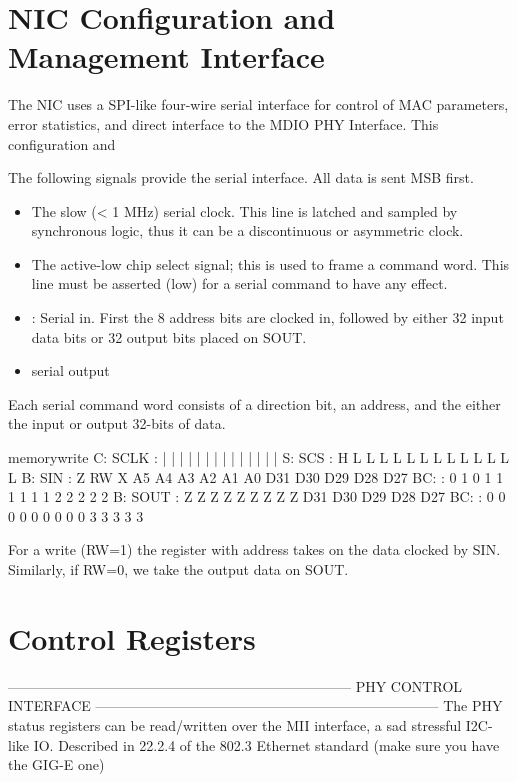 \section{NIC Configuration and Management Interface}
The NIC uses a SPI-like four-wire serial interface for control of MAC parameters, error statistics, and direct interface to the MDIO PHY Interface. This configuration and 


The following signals provide the serial interface. All data is sent MSB first. 
\begin{itemize}
\item {} The slow (< 1 MHz) serial clock. This line is latched and sampled by synchronous logic, thus it can be a discontinuous or asymmetric clock.
\item {} The active-low chip select signal; this is used to frame a command word. This line must be asserted (low) for a serial command to have any effect. 
\item {} : Serial in. First the 8 address bits are clocked in, followed by either 32 input data bits or 32 output bits placed on SOUT.
\item {} serial output
\end{itemize}

Each serial command word consists of a direction bit, an address, and the either the input or output 32-bits of data. 


\begin{timing}{memorywrite}
C: SCLK    :  |  |  |  |  |  |  |  |  |  |   |   |   |   |  
S: SCS     :  H  L  L  L  L  L  L  L  L  L   L   L   L   L  
B: SIN     :  Z  RW X  A5 A4 A3 A2 A1 A0 D31 D30 D29 D28 D27 
BC:        :  0  1  0  1  1  1  1  1  1  2   2   2   2   2
B: SOUT    :  Z  Z  Z  Z  Z  Z  Z  Z  Z  D31 D30 D29 D28 D27
BC:        :  0  0  0  0  0  0  0  0  0  3   3   3   3   3 
\end{timing}

For a write (RW=1) the register with address  takes on the data clocked by SIN. Similarly, if RW=0, we take the output data on SOUT. 

\section{Control Registers}

--------------------------------------------------------------------------
PHY CONTROL INTERFACE
--------------------------------------------------------------------------
The PHY status registers can be read/written over the MII interface, a sad stressful I2C-like IO. Described in 22.2.4 of the 802.3 Ethernet standard (make sure you have the GIG-E one)


